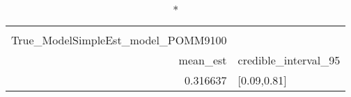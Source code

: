 \begin{longtable}{rl}
\caption*{
{\large Ssummarytable} \\ 
{\small True\_ModelSimpleEst\_model\_POMM9100}
} \\ 
\toprule
mean\_est & credible\_interval\_95 \\ 
\midrule
0.316637 & [0.09,0.81] \\ 
\bottomrule
\end{longtable}

